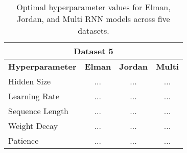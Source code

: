 \begin{table}[H]
\begin{tabular}{|l|c|c|c|}
        \multicolumn{4}{|c|}{\textbf{Dataset 5}} \\ \hline
        \textbf{Hyperparameter} & \textbf{Elman} & \textbf{Jordan} & \textbf{Multi} \\ 
        \hline 
        Hidden Size & ... & ... & ... \\ 
        \hline
        Learning Rate & ... & ... & ... \\ 
        \hline
        Sequence Length & ... & ... & ... \\ 
        \hline
        Weight Decay & ... & ... & ... \\ 
        \hline
        Patience & ... & ... & ... \\ 
        \hline 
    \end{tabular}
    \vspace{12pt}
    \caption{Optimal hyperparameter values for Elman, Jordan, and Multi RNN models across five datasets.} 
    \label{hyperparameters}
\end{table}

